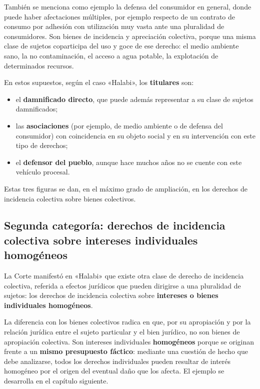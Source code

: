 \documentclass[12pt,oneside]{book}
\begin{document}
También se menciona como ejemplo la defensa del consumidor en general, donde puede haber afectaciones múltiples, por ejemplo respecto de un contrato de consumo por adhesión con utilización muy vasta ante una pluralidad de consumidores. Son bienes de incidencia y apreciación colectiva, porque una misma clase de sujetos coparticipa del uso y goce de ese derecho: el medio ambiente sano, la no contaminación, el acceso a agua potable, la explotación de determinados recursos.

En estos supuestos, según el caso «Halabi», los \textbf{titulares} son:

\begin{itemize}
    \item el \textbf{damnificado directo}, que puede además representar a su clase de sujetos damnificados;
    \item las \textbf{asociaciones} (por ejemplo, de medio ambiente o de defensa del consumidor) con coincidencia en su objeto social y en su intervención con este tipo de derechos;
    \item el \textbf{defensor del pueblo}, aunque hace muchos años no se cuente con este vehículo procesal.
\end{itemize}

Estas tres figuras se dan, en el máximo grado de ampliación, en los derechos de incidencia colectiva sobre bienes colectivos.

\subsection{Segunda categoría: derechos de incidencia colectiva sobre intereses individuales homogéneos}

La Corte manifestó en «Halabi» que existe otra clase de derecho de incidencia colectiva, referida a efectos jurídicos que pueden dirigirse a una pluralidad de sujetos: los derechos de incidencia colectiva sobre \textbf{intereses o bienes individuales homogéneos}.

La diferencia con los bienes colectivos radica en que, por su apropiación y por la relación jurídica entre el sujeto particular y el bien jurídico, no son bienes de apropiación colectiva. Son intereses individuales \textbf{homogéneos} porque se originan frente a un \textbf{mismo presupuesto fáctico}: mediante una cuestión de hecho que debe analizarse, todos los derechos individuales pueden resultar de interés homogéneo por el origen del eventual daño que los afecta. El ejemplo se desarrolla en el capítulo siguiente.
\end{document}
